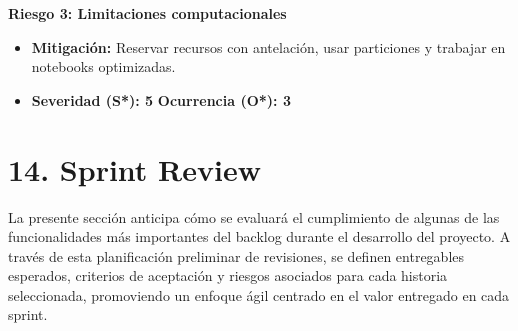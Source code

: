 \documentclass[
11pt, %
]{charter}
\begin{document}
\textbf{Riesgo 3: Limitaciones computacionales}
\begin{itemize}
  \item \textbf{Mitigación:} Reservar recursos con antelación, usar particiones y trabajar en notebooks optimizadas.
  \item \textbf{Severidad (S*): 5} \quad \textbf{Ocurrencia (O*): 3}
\end{itemize}

\section{14. Sprint Review}
\label{sec:sprint_review}

La presente sección anticipa cómo se evaluará el cumplimiento de algunas de las funcionalidades más importantes del backlog durante el desarrollo del proyecto. A través de esta planificación preliminar de revisiones, se definen entregables esperados, criterios de aceptación y riesgos asociados para cada historia seleccionada, promoviendo un enfoque ágil centrado en el valor entregado en cada sprint.
\end{document}
